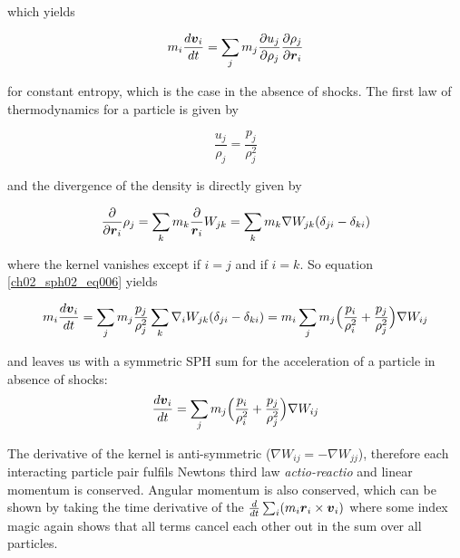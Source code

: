 which yields 

\begin{equation}
\label{ch02_sph02_eq006}
m_i \frac{d \boldsymbol{v}_i }{dt} = \sum_{j} m_j \frac{\partial u_j}{\partial \rho_j} \frac{\partial \rho_j}{\partial \boldsymbol{r}_i}
\end{equation}

for constant entropy, which is the case in the absence of shocks. The first law of thermodynamics for a particle is given by

\begin{equation}
\label{ch02_sph02_eq007}
\frac{u_j}{\rho_j} = \frac{p_j}{\rho_j^2}
\end{equation}

and the divergence of the density is directly given by

\begin{equation}
\label{ch02_sph02_eq008}
\frac{\partial }{\partial \boldsymbol{r}_i} \rho_j
= \sum_{k} m_k \frac{\partial}{\boldsymbol{r}_i} W_{jk} 
= \sum_{k} m_k \nabla W_{jk} ( \delta_{ji} - \delta_{ki})
\end{equation}

where the kernel vanishes except if $i = j$ and if $i = k$. So equation \ref{ch02_sph02_eq006} yields

\begin{equation}
\label{ch02_sph02_eq009}
m_i \frac{d \boldsymbol{v}_i }{dt} = \sum_{j} m_j \frac{p_j}{\rho_j^2} \sum_{k} \nabla_i W_{jk} ( \delta_{ji} - \delta_{ki})\\
 = m_i \sum_{j} m_j \Big( \frac{p_i}{\rho_i^2} + \frac{p_j}{\rho_j^2} \Big) \nabla W_{ij}
\end{equation}

and leaves us with a symmetric SPH sum for the acceleration of a particle in absence of shocks:
\begin{equation}
\label{ch02_sph02_eq010}
\frac{d \boldsymbol{v}_i }{dt} = \sum_{j} m_j \Big( \frac{p_i}{\rho_i^2} + \frac{p_j}{\rho_j^2} \Big) \nabla W_{ij}
\end{equation}

The derivative of the kernel is anti-symmetric ($\nabla W_{ij} = - \nabla W_{jj}$), therefore each interacting particle pair fulfils Newtons third law \emph{actio-reactio} and linear momentum is conserved. Angular momentum is also conserved, which can be shown by taking the time derivative of the $\frac{d}{dt} \sum_i (m_i \boldsymbol{r}_i \times \boldsymbol{v}_i)$ where some index magic \citep{Price:2004p2613} again shows that all terms cancel each other out in the sum over all particles.

